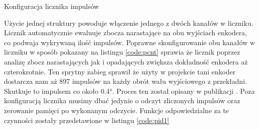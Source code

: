             \begin{kod}
              \inputminted[firstline=52,lastline=82]{cpp}{esp/listings/motor.cpp}
              \caption{Konfiguracja licznika impulsów}
              \label{code:pcnt}
              \vspace{2em}
            \end{kod} 
            
            Użycie jednej struktury powoduje włączenie jednego z dwóch kanałów w liczniku. Licznik automatycznie ewaluuje zbocza narastające na obu wyjściach enkodera, co podwaja wykrywaną ilość impulsów. Poprawne skonfigurowanie obu kanałów w liczniku w sposób pokazany na listingu \ref{code:pcnt} sprawia że licznik poprzez analizę zbocz narastających jak i opadających zwiększa dokładność enkodera aż czterokrotnie. Ten sprytny zabieg sprawił że użyty w projekcie tani enkoder dostarcza nam aż 897 impulsów na każdy obrót wału wyjściowego z przekładni. Skutkuje to impulsem co około 0.4°. Proces ten został opisany w publikacji \cite{enkoder}. Poza konfiguracją licznika musimy dbać jedynie o odczyt zliczonych impulsów oraz zerowanie pamięci po wykonanym odczycie. Funkcje odpowiedzialne za te czynności zostały przedstawione w listingu \ref{code:pid1}